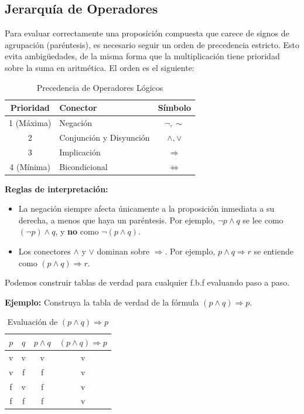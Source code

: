 \subsection{Jerarquía de Operadores}

Para evaluar correctamente una proposición compuesta que carece de signos de agrupación (paréntesis), es necesario seguir un orden de precedencia estricto. Esto evita ambigüedades, de la misma forma que la multiplicación tiene prioridad sobre la suma en aritmética. El orden es el siguiente:

\begin{table}[ht]
\caption{Precedencia de Operadores Lógicos}\label{tabla:jerarquia}
\centering
\begin{tabular}{|c|l|c|}
\hline
\textbf{Prioridad} & \textbf{Conector} & \textbf{Símbolo} \\ \hline
1 (Máxima) & Negación & $\lnot, \sim$ \\ \hline
2 & Conjunción y Disyunción & $\land, \lor$ \\ \hline
3 & Implicación & $\Rightarrow$ \\ \hline
4 (Mínima) & Bicondicional & $\iff$ \\ \hline
\end{tabular}
\end{table}

\noindent \textbf{Reglas de interpretación:}
\begin{itemize}
    \item La negación siempre afecta únicamente a la proposición inmediata a su derecha, a menos que haya un paréntesis. Por ejemplo, $\lnot p \land q$ se lee como $(\lnot p) \land q$, y \textbf{no} como $\lnot (p \land q)$.
    \item Los conectores $\land$ y $\lor$ dominan sobre $\Rightarrow$. Por ejemplo, $p \land q \Rightarrow r$ se entiende como $(p \land q) \Rightarrow r$.
\end{itemize}

Podemos construir tablas de verdad para cualquier f.b.f evaluando paso a paso.

\vspace{0.5cm}
\noindent \textbf{Ejemplo:} Construya la tabla de verdad de la fórmula $(p \land q)\Rightarrow p$.

\begin{table}[ht]
\caption{Evaluación de $(p \land q) \Rightarrow p$}\label{tabla:ejemplo1}
\centering
\begin{tabular}{|c|c|c|c|}
\hline
$p$ & $q$ & $ p \land q $ & $(p \land q) \Rightarrow p$ \\ \hline
v & v & v & v \\ \hline
v & f & f & v \\ \hline
f & v & f & v \\ \hline
f & f & f & v \\ \hline
\end{tabular}
\end{table}

